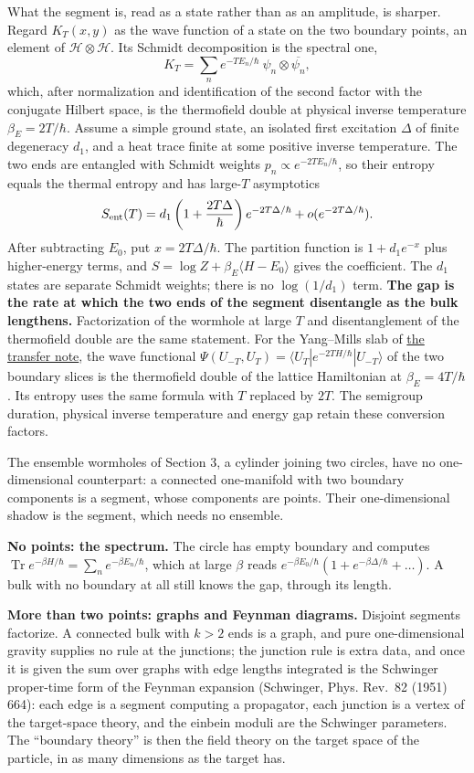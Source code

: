 \documentclass[11pt,a4paper]{article}
\begin{document}
What the segment is, read as a state rather than as an amplitude, is
sharper. Regard \(K_T(x,y)\) as the wave function of a state on the two
boundary points, an element of \(\mathcal H\otimes\mathcal H\). Its
Schmidt decomposition is the spectral one,
\[K_T=\sum_ne^{-TE_n/\hbar}\ \psi_n\otimes\overline{\psi_n},\] which,
after normalization and identification of the second factor with the
conjugate Hilbert space, is the thermofield double at physical inverse
temperature \(\beta_E=2T/\hbar\). Assume a simple ground state, an
isolated first excitation \(\Delta\) of finite degeneracy \(d_1\), and a
heat trace finite at some positive inverse temperature. The two ends are
entangled with Schmidt weights \(p_n\propto e^{-2TE_n/\hbar}\), so their
entropy equals the thermal entropy and has large-\(T\) asymptotics
\[S_{\rm ent}(T)=d_1\left(1+\frac{2T\Delta}{\hbar}\right)
 e^{-2T\Delta/\hbar}+o(e^{-2T\Delta/\hbar}).\] After subtracting
\(E_0\), put \(x=2T\Delta/\hbar\). The partition function is
\(1+d_1e^{-x}\) plus higher-energy terms, and
\(S=\log Z+\beta_E\langle H-E_0\rangle\) gives the coefficient. The
\(d_1\) states are separate Schmidt weights; there is no \(\log(1/d_1)\)
term. \textbf{The gap is the rate at which the two ends of the segment
disentangle as the bulk lengthens.} Factorization of the wormhole at
large \(T\) and disentanglement of the thermofield double are the same
statement. For the Yang--Mills slab of
\href{ground-state-measure-transfer.md}{the transfer note}, the wave
functional \(\Psi(U_{-T},U_T)=\langle U_T|e^{-2TH/\hbar}|U_{-T}\rangle\)
of the two boundary slices is the thermofield double of the lattice
Hamiltonian at \(\beta_E=4T/\hbar\). Its entropy uses the same formula
with \(T\) replaced by \(2T\). The semigroup duration, physical inverse
temperature and energy gap retain these conversion factors.

The ensemble wormholes of Section 3, a cylinder joining two circles,
have no one-dimensional counterpart: a connected one-manifold with two
boundary components is a segment, whose components are points. Their
one-dimensional shadow is the segment, which needs no ensemble.

\textbf{No points: the spectrum.} The circle has empty boundary and
computes
\(\operatorname{Tr}e^{-\beta H/\hbar}=\sum_ne^{-\beta E_n/\hbar}\),
which at large \(\beta\) reads
\(e^{-\beta E_0/\hbar}(1+e^{-\beta\Delta/\hbar}+\dots)\). A bulk with no
boundary at all still knows the gap, through its length.

\textbf{More than two points: graphs and Feynman diagrams.} Disjoint
segments factorize. A connected bulk with \(k>2\) ends is a graph, and
pure one-dimensional gravity supplies no rule at the junctions; the
junction rule is extra data, and once it is given the sum over graphs
with edge lengths integrated is the Schwinger proper-time form of the
Feynman expansion (Schwinger, Phys. Rev.~82 (1951) 664): each edge is a
segment computing a propagator, each junction is a vertex of the
target-space theory, and the einbein moduli are the Schwinger
parameters. The ``boundary theory'' is then the field theory on the
target space of the particle, in as many dimensions as the target has.
\end{document}
